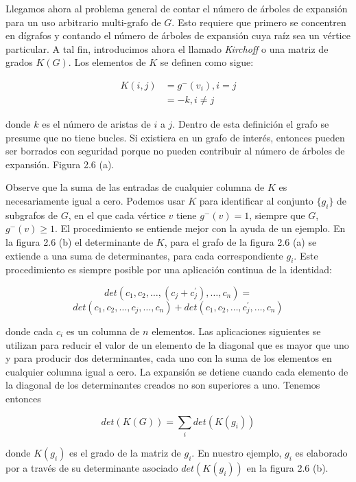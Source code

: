 \documentclass[10pt,a5paper]{book}
\begin{document}
Llegamos ahora al problema general de contar el número de árboles de expansión para un uso arbitrario multi-grafo de $G$. Esto requiere que primero se concentren en dígrafos y contando el número de árboles de expansión cuya raíz sea un vértice particular. A tal fin, introducimos ahora el llamado \emph{Kirchoff} o una matriz de grados $K(G)$. Los elementos de $K$ se definen como sigue:

\begin{align}
K(i,j) & = g^-(v_i), i = j \nonumber \\
& = -k, i \ne j \nonumber
\end{align}

donde $k$ es el número de aristas de $i$ a $j$. Dentro de esta definición el grafo se presume que no tiene bucles. Si existiera en un grafo de interés, entonces pueden ser borrados con seguridad porque no pueden contribuir al número de árboles de expansión. Figura 2.6 (a).

Observe que la suma de las entradas de cualquier columna de $K$ es necesariamente igual a cero. Podemos usar $K$ para identificar al conjunto $\{g_i\}$ de subgrafos de $G$, en el que cada vértice $v$ tiene $g^-(v) = 1$, siempre que $G$, $g^-(v) \ge 1$. El procedimiento  se entiende mejor con la ayuda de un ejemplo. En la figura 2.6 (b) el determinante de $K$, para el grafo de la figura 2.6 (a) se extiende a una suma de determinantes, para cada correspondiente $g_i$. Este procedimiento es siempre posible por una aplicación continua de la identidad:

\[ det(c_1,c_2, \ldots,(c_j + c^{'}_j), \ldots, c_n) = \]
\[ det(c_1, c_2, \ldots, c_j, \ldots, c_n) + det(c_1,c_2, \ldots, c^{'}_j, \ldots, c_n) \]

donde cada $c_i$ es un columna de $n$ elementos. Las aplicaciones siguientes se utilizan para reducir el valor de un elemento de la diagonal que es mayor que uno y para producir dos determinantes, cada uno con la suma de los elementos en cualquier columna igual a cero. La expansión se detiene cuando cada elemento de la diagonal de los determinantes creados no son superiores a uno. Tenemos entonces

\[ det(K(G)) = \sum_i det(K(g_i)) \]

donde $K(g_i)$ es el grado de la matriz de $g_i$. En nuestro ejemplo, $g_i$ es elaborado por a través de su determinante asociado $det(K(g_i))$ en la figura 2.6 (b).
\end{document}

